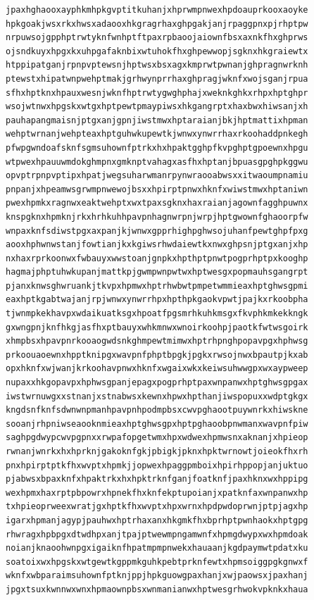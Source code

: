 \documentclass[11pt,letterpaper]{exam}
\begin{document}
\begin{questions}
\begin{verbatim}
jpaxhghaooxayphkmhpkgvptitkuhanjxhprwmpnwexhpdoauprkooxaoyke
hpkgoakjwsxrkxhwsxadaooxhkgragrhaxghpgakjanjrpaggpnxpjrhptpw
nrpuwsojgpphptrwtyknfwnhptftpaxrpbaoojaiownfbsxaxnkfhxghprws
ojsndkuyxhpgxkxuhpgafaknbixwtuhokfhxghpewwopjsgknxhkgraiewtx
htppipatganjrpnpvptewsnjhptwsxbsxagxkmprwtpwnanjghpragnwrknh
ptewstxhipatwnpwehptmakjgrhwynprrhaxghpragjwknfxwojsganjrpua
sfhxhptknxhpauxwesnjwknfhptrwtygwghphajxweknkghkxrhpxhptghpr
wsojwtnwxhpgskxwtgxhptpewtpmaypiwsxhkgangrptxhaxbwxhiwsanjxh
pauhapangmaisnjptgxanjgpnjiwstmwxhptaraianjbkjhptmattixhpman
wehptwrnanjwehpteaxhptguhwkupewtkjwnwxynwrrhaxrkoohaddpnkegh
pfwpgwndoafsknfsgmsuhownfptrkxhxhpaktgghpfkvpghptgpoewnxhpgu
wtpwexhpauuwmdokghmpnxgmknptvahagxasfhxhptanjbpuasgpghpkggwu
opvptrpnpvptipxhpatjwegsuharwmanrpynwraooabwsxxitwaoumpnamiu
pnpanjxhpeamwsgrwmpnwewojbsxxhpirptpnwxhknfxwiwstmwxhptaniwn
pwexhpmkxragnwxeaktwehptxwxtpaxsgknxhaxraianjagownfagghpuwnx
knspgknxhpmknjrkxhrhkuhhpavpnhagnwrpnjwrpjhptgwownfghaoorpfw
wnpaxknfsdiwstpgxaxpanjkjwnwxgpprhighpghwsojuhanfpewtghpfpxg
aooxhphwnwstanjfowtianjkxkgiwsrhwdaiewtkxnwxghpsnjptgxanjxhp
nxhaxrprkoonwxfwbauyxwwstoanjgnpkxhpthptpnwtpogprhptpxkooghp
hagmajphptuhwkupanjmattkpjgwmpwnpwtwxhptwesgxpopmauhsgangrpt
pjanxknwsghwruankjtkvpxhpmwxhptrhwbwtpmpetwmmieaxhptghwsgpmi
eaxhptkgabtwajanjrpjwnwxynwrrhpxhpthpkgaokvpwtjpajkxrkoobpha
tjwnmpkekhavpxwdaikuatksgxhpoatfpgsmrhkuhkmsgxfkvphkmkekkngk
gxwngpnjknfhkgjasfhxptbauyxwhkmnwxwnoirkoohpjpaotkfwtwsgoirk
xhmpbsxhpavpnrkooaogwdsnkghmpewtmimwxhptrhpnghpopavpgxhphwsg
prkoouaoewnxhpptknipgxwavpnfphptbpgkjpgkxrwsojnwxbpautpjkxab
opxhknfxwjwanjkrkoohavpnwxhknfxwgaixwkxkeiwsuhwwgpxwxaypweep
nupaxxhkgopavpxhphwsgpanjepagxpogprhptpaxwnpanwxhptghwsgpgax
iwstwrnuwgxxstnanjxstnabwsxkewnxhpwxhpthanjiwspopuxxwdptgkgx
kngdsnfknfsdwnwnpmanhpavpnhpodmpbsxcwvpghaootpuywnrkxhiwskne
sooanjrhpniwseaooknmieaxhptghwsgpxhptpghaoobpnwmanxwavpnfpiw
saghpgdwypcwvpgpnxxrwpafopgetwmxhpxwdwexhpmwsnxaknanjxhpieop
rwnanjwnrkxhxhprknjgakoknfgkjpbigkjpknxhpktwrnowtjoieokfhxrh
pnxhpirptptkfhxwvptxhpmkjjopwexhpaggpmboixhpirhppopjanjuktuo
pjabwsxbpaxknfxhpaktrkxhxhpktrknfganjfoatknfjpaxhknxwxhppipg
wexhpmxhaxrptpbpowrxhpnekfhxknfekptupoianjxpatknfaxwnpanwxhp
txhpieoprweexwratjgxhptkfhxwvptxhpxwrnxhpdpwdoprwnjptpjagxhp
igarxhpmanjagypjpauhwxhptrhaxanxhkgmkfhxbprhptpwnhaokxhptgpg
rhwragxhpbpgxdtwdhpxanjtpajptwewmpngamwnfxhpmgdwypxwxhpmdoak
noianjknaoohwnpgxigaiknfhpatmpmpnwekxhauaanjkgdpaymwtpdatxku
soatoixwxhpgskxwtgewtkgppmkguhkpebtprknfewtxhpmsoiggpgkgnwxf
wknfxwbparaimsuhownfptknjppjhpkguowgpaxhanjxwjpaowsxjpaxhanj
jpgxtsuxkwnnwxwnxhpmaownpbsxwnmanianwxhptwesgrhwokvpknkxhaua

\end{verbatim}
\end{questions}
\end{document}
